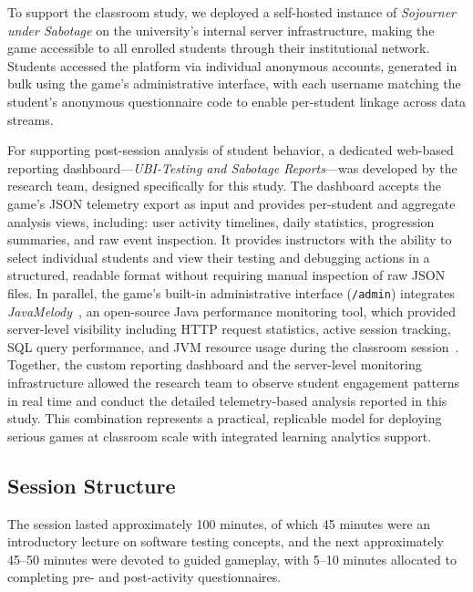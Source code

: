 \documentclass[conference]{IEEEtran}
\begin{document}
To support the classroom study, we deployed a self-hosted instance of \emph{Sojourner under Sabotage} on the university's internal server infrastructure, making the game accessible to all enrolled students through their institutional network.
Students accessed the platform via individual anonymous accounts, generated in bulk using the game's administrative interface, with each username matching the student's anonymous questionnaire code to enable per-student linkage across data streams.

For supporting post-session analysis of student behavior, a dedicated web-based reporting dashboard---\emph{UBI-Testing and Sabotage Reports}---was developed by the research team, designed specifically for this study.
The dashboard accepts the game's JSON telemetry export as input and provides per-student and aggregate analysis views, including: user activity timelines, daily statistics, progression summaries, and raw event inspection.
It provides instructors with the ability to select individual students and view their testing and debugging actions in a structured, readable format without requiring manual inspection of raw JSON files.
In parallel, the game's built-in administrative interface (\texttt{/admin}) integrates \emph{JavaMelody}~\cite{javamelody}, an open-source Java performance monitoring tool, which provided server-level visibility including HTTP request statistics, active session tracking, SQL query performance, and JVM resource usage during the classroom session~\cite{straubinger2025sojourner}.
Together, the custom reporting dashboard and the server-level monitoring infrastructure allowed the research team to observe student engagement patterns in real time and conduct the detailed telemetry-based analysis reported in this study. This combination represents a practical, replicable model for deploying serious games at classroom scale with integrated learning analytics support.

\subsection{Session Structure}
The session lasted approximately 100 minutes, of which 45 minutes were an introductory lecture on software testing concepts, and the next approximately 45–50 minutes were devoted to guided gameplay, with 5–10 minutes allocated to completing pre- and post-activity questionnaires.

\end{document}

